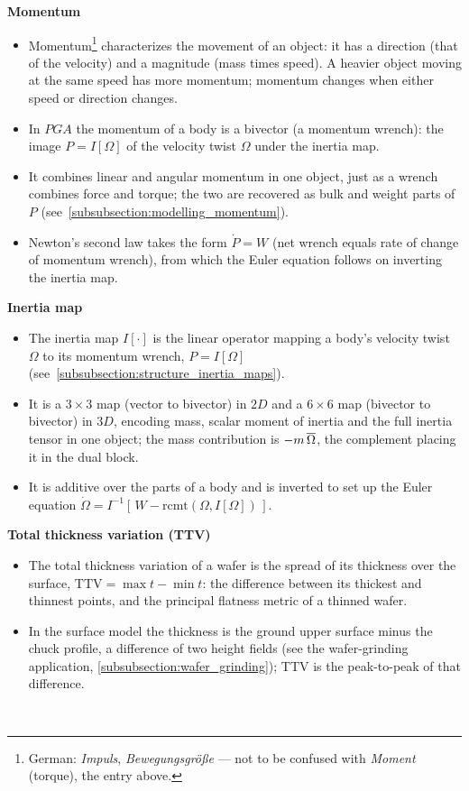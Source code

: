 \textbf{Momentum}
\begin{itemize}
    \item Momentum\footnote{German: \emph{Impuls}, \emph{Bewegungsgröße} --- not to be
    confused with \emph{Moment} (torque), the entry above.} characterizes the movement
    of an object: it has a direction (that of the velocity) and a magnitude (mass times
    speed). A heavier object moving at the same speed has more momentum; momentum changes
    when either speed or direction changes.

    \item In $PGA$ the momentum of a body is a bivector (a momentum wrench): the image
    $P = I[\Omega]$ of the velocity twist $\Omega$ under the inertia map.

    \item It combines linear and angular momentum in one object, just as a wrench
    combines force and torque; the two are recovered as bulk and weight parts of $P$
    (see~\ref{subsubsection:modelling_momentum}).

    \item Newton's second law takes the form $\dot{P} = W$ (net wrench equals rate of
    change of momentum wrench), from which the Euler equation follows on inverting the
    inertia map.
\end{itemize}

\textbf{Inertia map}
\begin{itemize}
    \item The inertia map $I[\cdot]$ is the linear operator mapping a body's velocity
    twist $\Omega$ to its momentum wrench, $P = I[\Omega]$
    (see~\ref{subsubsection:structure_inertia_maps}).

    \item It is a $3\times3$ map (vector to bivector) in $2D$ and a $6\times6$ map
    (bivector to bivector) in $3D$, encoding mass, scalar moment of inertia and the full
    inertia tensor in one object; the mass contribution is $-m\,\overline{\Omega}$, the
    complement placing it in the dual block.

    \item It is additive over the parts of a body and is inverted to set up the Euler
    equation $\dot{\Omega} = I^{-1}[\,W - \mathrm{rcmt}(\Omega, I[\Omega])\,]$.
\end{itemize}

\textbf{Total thickness variation (TTV)}
\begin{itemize}
    \item The total thickness variation of a wafer is the spread of its thickness over the
    surface, $\mathrm{TTV} = \max t - \min t$: the difference between its thickest and
    thinnest points, and the principal flatness metric of a thinned wafer.

    \item In the surface model the thickness is the ground upper surface minus the chuck
    profile, a difference of two height fields (see the wafer-grinding application,
    \ref{subsubsection:wafer_grinding}); TTV is the peak-to-peak of that difference.
\end{itemize}

\newpage
~